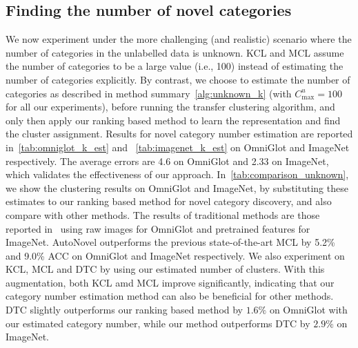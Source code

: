 \subsection{Finding the number of novel categories}
\label{s:results_unknown_k}
We now experiment under the more challenging (and realistic) scenario where the number of categories in the unlabelled data is unknown.
KCL and MCL assume the number of categories to be a large value (i.e., 100) instead of estimating the number of categories explicitly.
By contrast, we choose to estimate the number of categories as described in method summary~\ref{alg:unknown_k} (with $C^u_\text{max} = 100$ for all our experiments), before running the transfer clustering algorithm, and only then apply our ranking based method to learn the representation and find the cluster assignment.
Results for novel category number estimation are reported in~\cref{tab:omniglot_k_est} and ~\cref{tab:imagenet_k_est} on OmniGlot and ImageNet respectively. The average errors are 4.6 on OmniGlot and 2.33 on ImageNet, which validates the effectiveness of our approach.
In~\cref{tab:comparison_unknown}, we show the clustering results on OmniGlot and ImageNet, by substituting these estimates to our ranking based method for novel category discovery, and also compare with other methods.
The results of traditional methods are those reported in~\cite{Hsu19_MCL} using raw images for OmniGlot and pretrained features for ImageNet.
AutoNovel outperforms the previous state-of-the-art MCL by 5.2\% and  9.0\% ACC on OmniGlot and ImageNet respectively.
We also experiment on KCL, MCL and DTC by using our estimated number of clusters.
With this augmentation, both KCL amd MCL improve significantly, indicating that our category number estimation method can also be beneficial for other methods. DTC slightly outperforms our ranking based method by $1.6\%$ on OmniGlot with our estimated category number, while our method outperforms DTC by $2.9\%$ on ImageNet.


